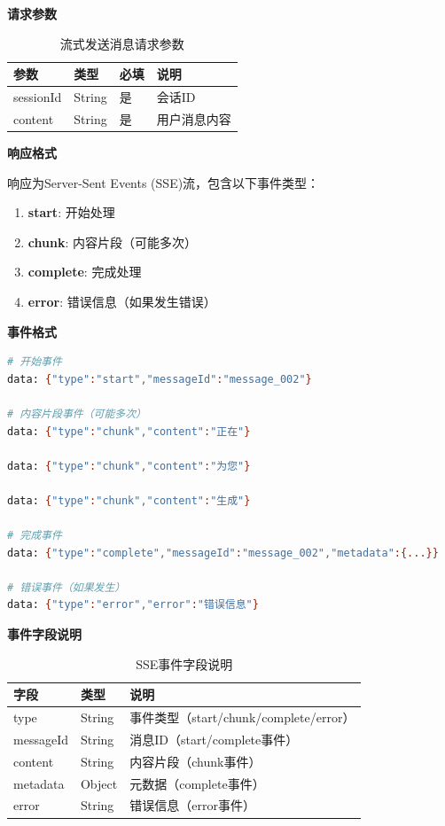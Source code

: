 \documentclass[12pt,a4paper]{article}
\begin{document}
\textbf{请求参数}

\begin{table}[h]
  \centering
  \begin{tabular}{llll}
    \toprule
    参数 & 类型 & 必填 & 说明 \\
    \midrule
    sessionId & String & 是 & 会话ID \\
    content & String & 是 & 用户消息内容 \\
    \bottomrule
  \end{tabular}
  \caption{流式发送消息请求参数}
\end{table}

\textbf{响应格式}

响应为Server-Sent Events (SSE)流，包含以下事件类型：

\begin{enumerate}
  \item \textbf{start}: 开始处理
  \item \textbf{chunk}: 内容片段（可能多次）
  \item \textbf{complete}: 完成处理
  \item \textbf{error}: 错误信息（如果发生错误）
\end{enumerate}

\textbf{事件格式}

\begin{lstlisting}[language=bash]
# 开始事件
data: {"type":"start","messageId":"message_002"}

# 内容片段事件（可能多次）
data: {"type":"chunk","content":"正在"}

data: {"type":"chunk","content":"为您"}

data: {"type":"chunk","content":"生成"}

# 完成事件
data: {"type":"complete","messageId":"message_002","metadata":{...}}

# 错误事件（如果发生）
data: {"type":"error","error":"错误信息"}
\end{lstlisting}

\textbf{事件字段说明}

\begin{table}[h]
  \centering
  \begin{tabular}{lll}
    \toprule
    字段 & 类型 & 说明 \\
    \midrule
    type & String & 事件类型（start/chunk/complete/error） \\
    messageId & String & 消息ID（start/complete事件） \\
    content & String & 内容片段（chunk事件） \\
    metadata & Object & 元数据（complete事件） \\
    error & String & 错误信息（error事件） \\
    \bottomrule
  \end{tabular}
  \caption{SSE事件字段说明}
\end{table}
\end{document}
